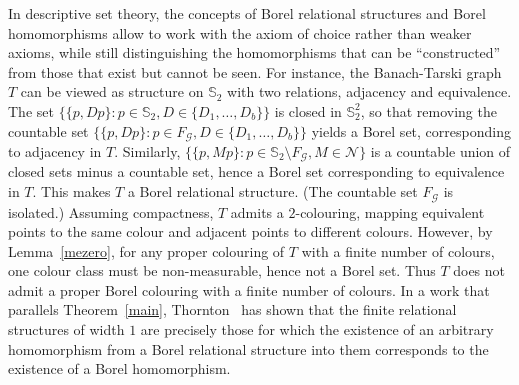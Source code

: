 \documentclass{lmcs}
\begin{document}
In descriptive set theory, the concepts of Borel 
relational structures and Borel homomorphisms allow
to work with the axiom of choice rather than
weaker axioms, while still distinguishing the homomorphisms that
can be ``constructed'' from those that exist but cannot be seen.
For instance, the Banach-Tarski graph $T$
can be viewed as structure on $\mathbb{S}_2$ with two relations, adjacency and equivalence.  The set
$\{ \{p, Dp\} : p \in \mathbb{S}_2, D \in \{D_1, \ldots, D_b\}\}$
is closed in $\mathbb{S}_2^2$, so that removing
the countable set 
$\{ \{p, Dp\} : p \in F_{\mathcal{G}}, D \in \{D_1, \ldots, D_b\}\}$
yields a Borel set, corresponding to adjacency in $T$.
Similarly, $\{ \{p, Mp\} : p \in \mathbb{S}_2 \setminus 
F_{\mathcal{G}}, M \in \mathcal{N} \}$ is a countable union of
closed sets minus a countable set, hence a Borel set
corresponding to equivalence in $T$. This makes $T$ a 
Borel relational structure. (The countable set $F_{\mathcal{G}}$
is isolated.)
Assuming compactness, $T$ admits a $2$-colouring,
mapping equivalent points to the same colour and
adjacent points to different colours. However, by
Lemma~\ref{mezero}, for any proper colouring of $T$
with a finite number of colours, one colour class must 
be non-measurable,
hence not a Borel set. Thus $T$ does not admit a 
proper Borel colouring with a finite number of colours.
In a work that parallels Theorem~\ref{main},
Thornton~\cite{thornton2022algebraicapproachborelcsps} 
has shown that the finite relational structures of
width $1$ are precisely those for which
the existence of an arbitrary homomorphism
from a Borel relational structure into them corresponds 
to the existence of a Borel homomorphism.



\end{document}
